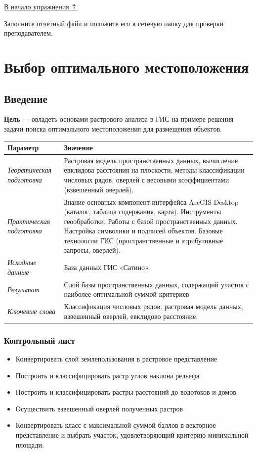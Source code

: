 \documentclass[]{book}
\providecommand{\tightlist}{%
  \setlength{\itemsep}{0pt}\setlength{\parskip}{0pt}}
\theoremstyle{definition}
\theoremstyle{definition}
\theoremstyle{definition}
\theoremstyle{remark}
\begin{document}
\protect\hyperlink{overlay}{В начало упражнения ⇡}

Заполните отчетный файл и положите его в сетевую папку для проверки
преподавателем.

\hypertarget{weighted-overlay}{%
\chapter{Выбор оптимального местоположения}\label{weighted-overlay}}

\hypertarget{weighted-overlay-intro}{%
\section{Введение}\label{weighted-overlay-intro}}

\textbf{Цель} --- овладеть основами растрового анализа в ГИС на примере
решения задачи поиска оптимального местоположения для размещения
объектов.

\begin{longtable}[]{@{}ll@{}}
\toprule
Параметр & Значение\tabularnewline
\midrule
\endhead
\emph{Теоретическая подготовка} & Растровая модель пространственных
данных, вычисление евклидова расстояния на плоскости, методы
классификации числовых рядов, оверлей с весовыми коэффициентами
(взвешенный оверлей).\tabularnewline
\emph{Практическая подготовка} & Знание основных компонент интерфейса
ArcGIS Desktop (каталог, таблица содержания, карта). Инструменты
геообработки. Работы с базой пространственных данных. Настройка
символики и подписей объектов. Базовые технологии ГИС (пространственные
и атрибутивные запросы, оверлей).\tabularnewline
\emph{Исходные данные} & База данных ГИС «Сатино».\tabularnewline
\emph{Результат} & Слой базы пространственных данных, содержащий участок
с наиболее оптимальной суммой критериев\tabularnewline
\emph{Ключевые слова} & Классификация числовых рядов, растровая модель
данных, взвешенный оверлей, евклидово расстояние.\tabularnewline
\bottomrule
\end{longtable}

\hypertarget{weighted-overlay-control}{%
\subsection{Контрольный лист}\label{weighted-overlay-control}}

\begin{itemize}
\tightlist
\item
  Конвертировать слой землепользования в растровое представление
\item
  Построить и классифицировать растр углов наклона рельефа
\item
  Построить и классифицировать растры расстояний до водотоков и домов
\item
  Осуществить взвешенный оверлей полученных растров
\item
  Конвертировать класс с максимальной суммой баллов в векторное
  представление и выбрать участок, удовлетворяющий критерию минимальной
  площади.
\end{itemize}
\end{document}
